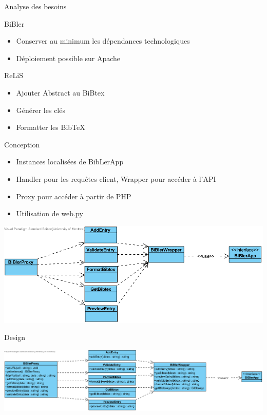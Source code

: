 \documentclass{beamer}
\begin{document}
\begin{frame}{Analyse des besoins}

\begin{block}{BiBler} 
\begin{itemize}
  \item Conserver au minimum les dépendances technologiques
  \item Déploiement possible sur Apache
\end{itemize}
\end{block}

\begin{block}{ReLiS} 
\begin{itemize}
  \item Ajouter Abstract au BiBtex
  \item Générer les clés
  \item Formatter les BibTeX
\end{itemize}
\end{block}


\end{frame}


\begin{frame}{Conception}

\begin{itemize}
  \item Instances localisées de BibLerApp
  \item Handler pour les requêtes client, Wrapper pour accéder à l'API
  \item Proxy pour accéder à partir de PHP
  \item Utilisation de web.py
\end{itemize}


\includegraphics[width=\linewidth,height=\textheight,keepaspectratio]{DomainClassDiagram.png}


\end{frame}
\begin{frame}{Design}

\includegraphics[width=\linewidth,height=\textheight,keepaspectratio]{ClassDiagram.png}
\end{frame}
\end{document}
